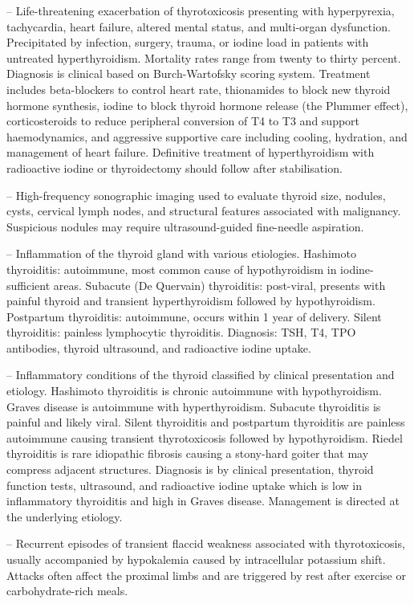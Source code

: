 -- Life-threatening exacerbation of thyrotoxicosis presenting with hyperpyrexia, tachycardia, heart failure, altered mental status, and multi-organ dysfunction. Precipitated by infection, surgery, trauma, or iodine load in patients with untreated hyperthyroidism. Mortality rates range from twenty to thirty percent. Diagnosis is clinical based on Burch-Wartofsky scoring system. Treatment includes beta-blockers to control heart rate, thionamides to block new thyroid hormone synthesis, iodine to block thyroid hormone release (the Plummer effect), corticosteroids to reduce peripheral conversion of T4 to T3 and support haemodynamics, and aggressive supportive care including cooling, hydration, and management of heart failure. Definitive treatment of hyperthyroidism with radioactive iodine or thyroidectomy should follow after stabilisation.

-- High-frequency sonographic imaging used to evaluate thyroid size, nodules, cysts, cervical lymph nodes, and structural features associated with malignancy. Suspicious nodules may require ultrasound-guided fine-needle aspiration.

-- Inflammation of the thyroid gland with various etiologies. Hashimoto thyroiditis: autoimmune, most common cause of hypothyroidism in iodine-sufficient areas. Subacute (De Quervain) thyroiditis: post-viral, presents with painful thyroid and transient hyperthyroidism followed by hypothyroidism. Postpartum thyroiditis: autoimmune, occurs within 1 year of delivery. Silent thyroiditis: painless lymphocytic thyroiditis. Diagnosis: TSH, T4, TPO antibodies, thyroid ultrasound, and radioactive iodine uptake.

-- Inflammatory conditions of the thyroid classified by clinical presentation and etiology. Hashimoto thyroiditis is chronic autoimmune with hypothyroidism. Graves disease is autoimmune with hyperthyroidism. Subacute thyroiditis is painful and likely viral. Silent thyroiditis and postpartum thyroiditis are painless autoimmune causing transient thyrotoxicosis followed by hypothyroidism. Riedel thyroiditis is rare idiopathic fibrosis causing a stony-hard goiter that may compress adjacent structures. Diagnosis is by clinical presentation, thyroid function tests, ultrasound, and radioactive iodine uptake which is low in inflammatory thyroiditis and high in Graves disease. Management is directed at the underlying etiology.

-- Recurrent episodes of transient flaccid weakness associated with thyrotoxicosis, usually accompanied by hypokalemia caused by intracellular potassium shift. Attacks often affect the proximal limbs and are triggered by rest after exercise or carbohydrate-rich meals.

